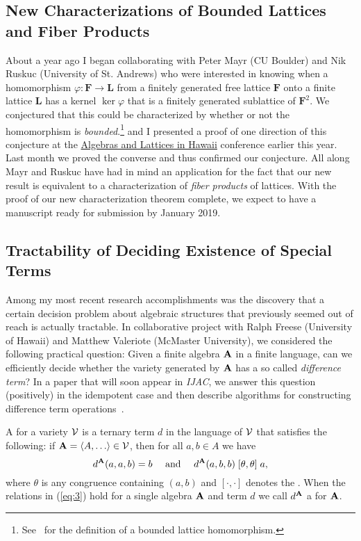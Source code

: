 \subsection{New Characterizations of Bounded Lattices and Fiber Products}
\label{sec:fiber}
About a year ago I began collaborating with Peter Mayr (CU Boulder) and Nik Ruskuc (University of St. Andrews) who were interested in knowing when a homomorphism $\varphi \colon \mathbf{F} \to \mathbf{L}$ from a finitely generated free lattice $\mathbf{F}$ onto a finite lattice $\mathbf L$ has a kernel $\ker \varphi$ that is a finitely generated sublattice of $\mathbf{F}^2$.  We conjectured that this could be characterized by whether or not the homomorphism is \emph{bounded}.\footnote{See~\cite{MR1319815} for the definition of a bounded lattice homomorphism.} and I presented a proof of one direction of this conjecture at the \href{https://universalalgebra.github.io/ALH-2018/}{Algebras and Lattices in Hawaii} conference earlier this year. Last month we proved the converse and thus confirmed our conjecture.  All along Mayr and Ruskuc have had in mind an application for the fact that our new result is equivalent to a characterization of \emph{fiber products} of lattices.  With the proof of our new characterization theorem complete, we expect to have a manuscript ready for submission by January 2019.  


\subsection{Tractability of Deciding Existence of Special Terms}
\label{sec:diffterm}
Among my most recent research accomplishments was the discovery that a certain decision problem about algebraic structures that previously seemed out of reach is actually tractable. In collaborative project with Ralph Freese (University of Hawaii) and Matthew Valeriote (McMaster University), we considered the following practical question: Given a finite algebra $\mathbf{A}$ in a finite language, can we efficiently decide whether the variety generated by $\mathbf{A}$ has a so called \emph{difference term}? In a paper that will soon appear in \emph{IJAC}, we answer this question (positively) in the idempotent case and then describe algorithms for constructing difference term operations~\cite{DFV:2018}.
 
A  for a variety $\mathcal{V}$ is a ternary term $d$ in the language of $\mathcal{V}$ that satisfies the following:  if $\alg{A} = \<A, \dots \> \in \sV$, then for all $a, b \in A$ we have
  \begin{equation}
  \label{eq:3}
  d^{\mathbf{A}}(a,a,b) = b \quad \text{ and } \quad
  d^{\mathbf{A}}(a,b,b) \mathrel{[\theta, \theta]} a,
  \end{equation}
  where $\theta$ is any congruence %
  containing $(a,b)$
  and $[\cdot, \cdot]$ denotes the .
  When the relations in (\ref{eq:3}) hold for a single algebra $\mathbf{A}$ and term $d$ we call $d^{\mathbf{A}}$
  a  for $\mathbf{A}$.
  
